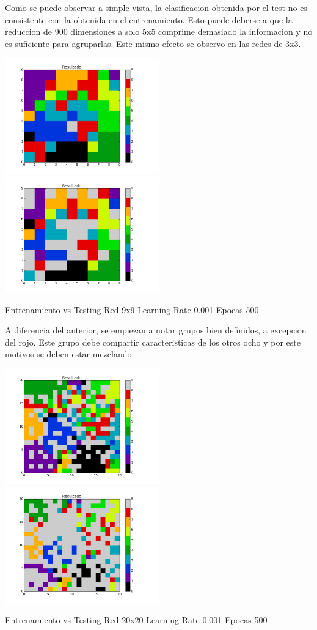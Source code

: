 Como se puede observar a simple vista, la clasificacion obtenida por el test no es consistente con la obtenida en el entrenamiento. Esto puede deberse a que la reduccion de 900 dimensiones a solo 5x5 comprime demasiado la informacion y no es suficiente para agruparlas. Este mismo efecto se observo en las redes de 3x3.

\includegraphics[width=0.5\textwidth]{img/ej2_train_M_9_lrate_001_epocas_500}
\includegraphics[width=0.5\textwidth]{img/ej2_test_M_9_lrate_001_epocas_500}
{\footnotesize Entrenamiento vs Testing Red 9x9 Learning Rate 0.001 Epocas 500\par}

A diferencia del anterior, se empiezan a notar grupos bien definidos, a excepcion del rojo. Este grupo debe compartir caracteristicas de los otros ocho y por este motivos se deben estar mezclando. 

\includegraphics[width=0.5\textwidth]{img/ej2_train_M_20_lrate_001_epocas_500}
\includegraphics[width=0.5\textwidth]{img/ej2_test_M_20_lrate_001_epocas_500}
{\center \footnotesize Entrenamiento vs Testing Red 20x20 Learning Rate 0.001 Epocas 500\par}

